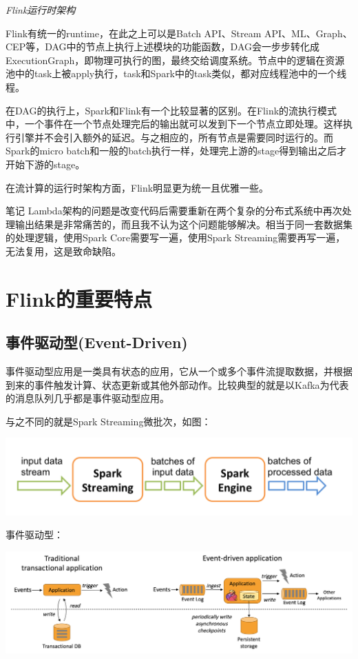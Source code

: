 \documentclass[oneside]{ctexbook}
\begin{document}
\textit{Flink运行时架构}

Flink有统一的runtime，在此之上可以是Batch API、Stream API、ML、Graph、CEP等，DAG中的节点上执行上述模块的功能函数，DAG会一步步转化成ExecutionGraph，即物理可执行的图，最终交给调度系统。节点中的逻辑在资源池中的task上被apply执行，task和Spark中的task类似，都对应线程池中的一个线程。

在DAG的执行上，Spark和Flink有一个比较显著的区别。在Flink的流执行模式中，一个事件在一个节点处理完后的输出就可以发到下一个节点立即处理。这样执行引擎并不会引入额外的延迟。与之相应的，所有节点是需要同时运行的。而Spark的micro batch和一般的batch执行一样，处理完上游的stage得到输出之后才开始下游的stage。

在流计算的运行时架构方面，Flink明显更为统一且优雅一些。

\begin{bclogo}[logo=\bcinfo, couleurBarre=orange, noborder=true, couleur=white]{笔记}
Lambda架构的问题是改变代码后需要重新在两个复杂的分布式系统中再次处理输出结果是非常痛苦的，而且我不认为这个问题能够解决。相当于同一套数据集的处理逻辑，使用Spark Core需要写一遍，使用Spark Streaming需要再写一遍，无法复用，这是致命缺陷。
\end{bclogo}

\section{Flink的重要特点}

\subsection{事件驱动型(Event-Driven)}

事件驱动型应用是一类具有状态的应用，它从一个或多个事件流提取数据，并根据到来的事件触发计算、状态更新或其他外部动作。比较典型的就是以Kafka为代表的消息队列几乎都是事件驱动型应用。

与之不同的就是Spark Streaming微批次，如图：

\noindent \includegraphics[width=\textwidth]{streaming-flow.png}

事件驱动型：

\noindent \includegraphics[width=\textwidth]{usecases-eventdrivenapps.png}
\end{document}
